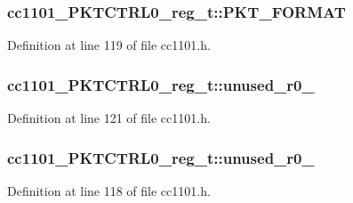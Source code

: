 \subsubsection[{\texorpdfstring{P\+K\+T\+\_\+\+F\+O\+R\+M\+AT}{PKT_FORMAT}}]{ cc1101\+\_\+\+P\+K\+T\+C\+T\+R\+L0\+\_\+reg\+\_\+t\+::\+P\+K\+T\+\_\+\+F\+O\+R\+M\+AT}\hypertarget{structcc1101___p_k_t_c_t_r_l0__reg__t_a7a4062d156e7b0d10fc69ebc0c47117e}{}\label{structcc1101___p_k_t_c_t_r_l0__reg__t_a7a4062d156e7b0d10fc69ebc0c47117e}


Definition at line 119 of file cc1101.\+h.

\subsubsection[{\texorpdfstring{unused\+\_\+r0\+\_\+1}{unused_r0_1}}]{ cc1101\+\_\+\+P\+K\+T\+C\+T\+R\+L0\+\_\+reg\+\_\+t\+::unused\+\_\+r0\+\_}\hypertarget{structcc1101___p_k_t_c_t_r_l0__reg__t_a801f05214c26acd693259f5e126d32ff}{}\label{structcc1101___p_k_t_c_t_r_l0__reg__t_a801f05214c26acd693259f5e126d32ff}


Definition at line 121 of file cc1101.\+h.

\subsubsection[{\texorpdfstring{unused\+\_\+r0\+\_\+2}{unused_r0_2}}]{ cc1101\+\_\+\+P\+K\+T\+C\+T\+R\+L0\+\_\+reg\+\_\+t\+::unused\+\_\+r0\+\_}\hypertarget{structcc1101___p_k_t_c_t_r_l0__reg__t_a0ff030087e4700cf1bc5f2f5a84403f7}{}\label{structcc1101___p_k_t_c_t_r_l0__reg__t_a0ff030087e4700cf1bc5f2f5a84403f7}


Definition at line 118 of file cc1101.\+h.

